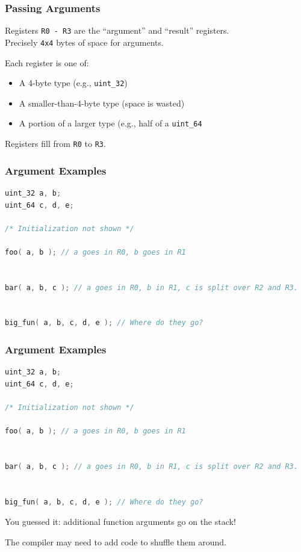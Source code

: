 \begin{frame}
\frametitle{Passing Arguments}

Registers \texttt{R0 - R3} are the ``argument'' and ``result'' registers.\\
\quad Precisely \texttt{4x4} bytes of space for arguments.

Each register is one of:\\\begin{itemize}
	\item A 4-byte type (e.g., \texttt{uint\_32})
	\item A smaller-than-4-byte type (space is wasted)
	\item A portion of a larger type (e.g., half of a \texttt{uint\_64}
\end{itemize}


Registers fill from \texttt{R0} to \texttt{R3}.


\end{frame}


\begin{frame}[fragile]
\frametitle{Argument Examples}

\begin{lstlisting}[language=C]
uint_32 a, b;
uint_64 c, d, e;

/* Initialization not shown */

foo( a, b ); // a goes in R0, b goes in R1


bar( a, b, c ); // a goes in R0, b in R1, c is split over R2 and R3.


big_fun( a, b, c, d, e ); // Where do they go?

\end{lstlisting}


\end{frame}


\begin{frame}[fragile]
\frametitle{Argument Examples}

\begin{lstlisting}[language=C]
uint_32 a, b;
uint_64 c, d, e;

/* Initialization not shown */

foo( a, b ); // a goes in R0, b goes in R1


bar( a, b, c ); // a goes in R0, b in R1, c is split over R2 and R3.


big_fun( a, b, c, d, e ); // Where do they go?

\end{lstlisting}

You guessed it: additional function arguments go on the stack!

The compiler may need to add code to shuffle them around.

\end{frame}


